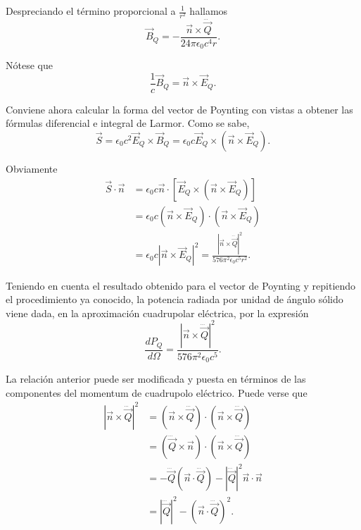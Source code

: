 \documentclass[12pt,a4paper]{book}
\begin{document}
Despreciando el término proporcional a $\frac{1}{r^2}$ hallamos
\begin{equation}
\vec{B}_Q = -\frac{\vec{n} \times \dddot{\vec{Q}}}{24\pi\epsilon_0c^4 r}.
\end{equation}

Nótese que
\begin{equation}
\frac{1}{c}\vec{B}_Q = \vec{n} \times \vec{E}_Q.
\end{equation}

Conviene ahora calcular la forma del vector de Poynting con vistas a obtener las fórmulas diferencial e integral de Larmor. Como se sabe,
\begin{equation}
\vec{S} = \epsilon_0 c^2 \vec{E}_Q \times \vec{B}_Q = \epsilon_0c \vec{E}_Q \times (\vec{n} \times \vec{E}_Q).
\end{equation}

Obviamente
\begin{align}
\vec{S} \cdot \vec{n} &= \epsilon_0 c \vec{n} \cdot [\vec{E}_Q \times (\vec{n} \times \vec{E}_Q)] \nonumber \\
&= \epsilon_0c (\vec{n} \times \vec{E}_Q) \cdot (\vec{n} \times \vec{E}_Q) \nonumber \\
&= \epsilon_0c |\vec{n} \times \vec{E}_Q|^2 = \frac{|\vec{n} \times \dddot{\vec{Q}}|^2}{576\pi^2\epsilon_0c^5 r^2}.
\end{align}

Teniendo en cuenta el resultado obtenido para el vector de Poynting y repitiendo el procedimiento ya conocido, la potencia radiada por unidad de ángulo sólido viene dada, en la aproximación cuadrupolar eléctrica, por la expresión
\begin{equation}
\frac{dP_Q}{d\Omega} = \frac{|\vec{n} \times \dddot{\vec{Q}}|^2}{576\pi^2 \epsilon_0 c^5}.
\end{equation}

La relación anterior puede ser modificada y puesta en términos de las componentes del momentum de cuadrupolo eléctrico. Puede verse que
\begin{align}
|\vec{n} \times \dddot{\vec{Q}}|^2 &= (\vec{n} \times \dddot{\vec{Q}}) \cdot (\vec{n} \times \dddot{\vec{Q}}) \nonumber \\
&= (\dddot{\vec{Q}} \times \vec{n}) \cdot (\vec{n} \times \dddot{\vec{Q}}) \nonumber \\
&= -\dddot{\vec{Q}}(\vec{n} \cdot \dddot{\vec{Q}}) - |\dddot{\vec{Q}}|^2\vec{n} \cdot \vec{n} \nonumber \\
&= |\dddot{\vec{Q}}|^2 - (\vec{n} \cdot \dddot{\vec{Q}})^2.
\end{align}
\end{document}
